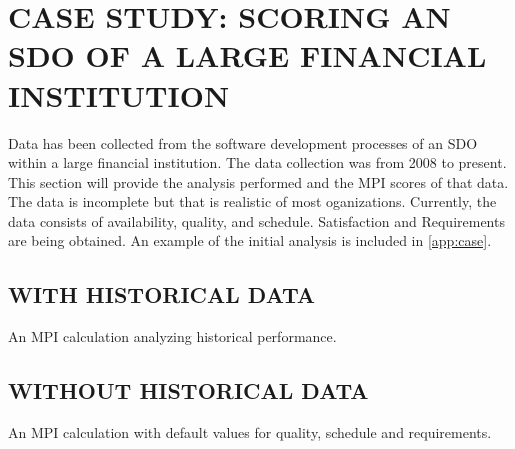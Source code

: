 \documentclass[SDSUThesis.tex]{subfiles}
\begin{document}
\section{CASE STUDY: SCORING AN SDO OF A LARGE FINANCIAL INSTITUTION}

Data has been collected from the software development processes of
an SDO within a large financial institution.
The data collection was from 2008 to present. This section will provide the analysis performed and the MPI scores of that data. The data is incomplete but that is realistic of most oganizations.  Currently, the data
consists of availability, quality, and schedule.  Satisfaction and Requirements are being obtained. An example of the initial analysis is included in \cref{app:case}.

\subsection{WITH HISTORICAL DATA}

An MPI calculation analyzing historical performance.

\subsection{WITHOUT HISTORICAL DATA}

An MPI calculation with default values for quality, schedule and requirements.


  
\end{document}
